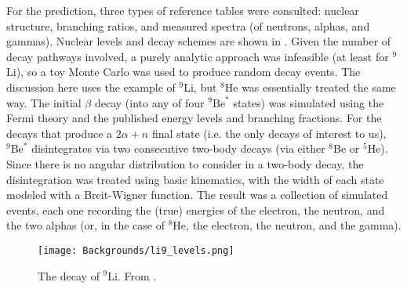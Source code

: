 \documentclass[../thesis.tex]{subfiles}
\begin{document}
\begin{comment}
An extraction of the spectrum from Daya Bay data was performed by Marshall in [XXX]. The approach takes advantage of the fact that \LiHe\ are essentially the only IBD-like events that are correlated with muons on the 100~ms timescale. A \LiHe-enriched sample was obtained by taking IBD-like events within 2---200~ms of a ``shower'' muon, here defined as one producing at least $2\times10^5$ photoelectrons. This sample contained various muon-uncorrelated ``backgrounds'', such as true IBDs and accidentals. In order to remove this contamination, a \LiHe-depleted sample was obtained by looking for IBD candidates with no preceding shower muons within 1.5~s. Before subtracting the two spectra, an appropriate normalization for the depleted sample had to be determined. This was done by performing the time-to-last-muon fit for the enriched sample, which indicated the number of true \LiHe\ events in the sample, in turn implying the number of non-\LiHe\ events. The depleted sample was thus normalized to this latter count, and the subtraction was performed, giving the results shown in Fig.~XXX.
\end{comment}

For the prediction, three types of reference tables were consulted: nuclear structure, branching ratios, and measured spectra (of neutrons, alphas, and gammas). Nuclear levels and decay schemes are shown in . Given the number of decay pathways involved, a purely analytic approach was infeasible (at least for $^9$Li), so a toy Monte Carlo was used to produce random decay events. The discussion here uses the example of $^9$Li, but $^8$He was essentially treated the same way. The initial $\beta$ decay (into any of four $^9\mathrm{Be}^*$ states) was simulated using the Fermi theory \cite{Fermi1934TentativoDU} and the published energy levels and branching fractions. For the decays that produce a $2\alpha+n$ final state (i.e. the only decays of interest to us), $^9\mathrm{Be}^*$ disintegrates via two consecutive two-body decays (via either $^8$Be or $^5$He). Since there is no angular distribution to consider in a two-body decay, the disintegration was treated using basic kinematics, with the width of each state modeled with a Breit-Wigner function. The result was a collection of simulated events, each one recording the (true) energies of the electron, the neutron, and the two alphas (or, in the case of $^8$He, the electron, the neutron, and the gamma).

\begin{figure}[h]
  \texttt{[image: Backgrounds/li9\_levels.png]}
  \caption{The decay of $^9$Li. From \cite{pedroLi9Spec2}.}
  \label{fig:li9_levels}
\end{figure}
\end{document}
